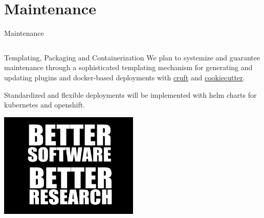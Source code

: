 
\section{Maintenance} \label{sec:maintenance}

\begin{frame}[t]{Maintenance}

    \begin{columns}
        \begin{column}{0.6\textwidth}
            \begin{block}{Templating, Packaging and Containerization}
                We plan to systemize and guarantee maintenance through a
                sophisticated templating mechanism for generating and updating
                plugins and docker-based deployments with
                \href{https://github.com/cruft/cruft}{cruft} and
                \href{https://github.com/cookiecutter/cookiecutter}{cookiecutter}.

                Standardized and flexible deployments will be implemented with
                helm charts for kubernetes and openshift.
            \end{block}

            \vspace{1em}

            \href{https://de-rse.org}{
                \includegraphics[width=0.5\textwidth]{figures/BetterSoftwareBetterResearchImage.jpg}
            }


\end{column}
\end{columns}
\end{frame}

